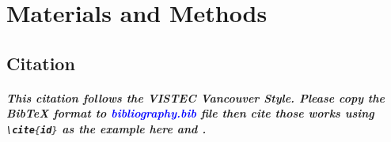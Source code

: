 \chapter{Materials and Methods}	
\label{chapter4}

\section{Citation}

\paragraph{
This citation follows the VISTEC Vancouver Style. Please copy the \textit{BibTeX} format to \textcolor{blue}{\textit{bibliography.bib}} file then cite those works using \lstinline[language=C]!\cite{id}! as the example here \cite{somework2020, min2net, 7298682, hu79, rabinscott59} and \cite{tonio_paper}.
}









